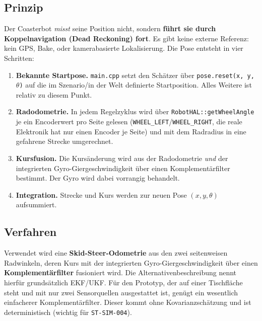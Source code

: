 \documentclass[
  a4paper,
  12pt,
  DIV=12,        %
  parskip=half,  %
  headings=small %
]{scrartcl}
\theoremstyle{definition}
\providecommand{\tightlist}{%
  \setlength{\itemsep}{0pt}\setlength{\parskip}{0pt}}
\theoremstyle{definition}
\begin{document}
\subsection{Prinzip}\label{lokalisierung-prinzip}

Der Coasterbot \emph{misst} seine Position nicht, sondern \textbf{führt
sie durch Koppelnavigation (Dead Reckoning) fort}. Es gibt keine externe
Referenz: kein GPS, Bake, oder kamerabasierte Lokalisierung.
Die Pose entsteht in vier Schritten:

\begin{enumerate}
\tightlist
\item
  \textbf{Bekannte Startpose.} \texttt{main.cpp} setzt den Schätzer über
  \texttt{pose.reset(x,\,y,\,\ensuremath{\theta})} auf die im
  Szenario/in der Welt definierte Startposition. Alles Weitere ist
  relativ zu diesem Punkt.
\item
  \textbf{Radodometrie.} In jedem Regelzyklus wird über
  \texttt{RobotHAL::getWheelAngle} je ein Encoderwert pro Seite gelesen
  (\texttt{WHEEL\_LEFT}/\texttt{WHEEL\_RIGHT}, die reale Elektronik hat
  nur einen Encoder je Seite) und mit dem Radradius in eine gefahrene
  Strecke umgerechnet.
\item
  \textbf{Kursfusion.} Die Kursänderung wird aus der Radodometrie
  \emph{und} der integrierten Gyro-Giergeschwindigkeit über einen
  Komplementärfilter bestimmt. Der Gyro wird dabei vorrangig behandelt.
\item
  \textbf{Integration.} Strecke und Kurs werden zur neuen Pose
  $(x, y, \theta)$ aufsummiert.
\end{enumerate}

\subsection{Verfahren}\label{lokalisierung-verfahren}

Verwendet wird eine \textbf{Skid-Steer-Odometrie} aus den zwei
seitenweisen Radwinkeln, deren Kurs mit der integrierten
Gyro-Giergeschwindigkeit über einen \textbf{Komplementärfilter}
fusioniert wird. Die
Alternativenbeschreibung nennt hierfür grundsätzlich EKF/UKF\@. Für den
Prototyp, der auf einer Tischfläche steht und mit nur zwei Sensorquellen ausgestattet
ist, genügt ein wesentlich einfacherer Komplementärfilter. Dieser kommt ohne
Kovarianzschätzung und ist deterministisch (wichtig für
\texttt{ST-SIM-004}).
\end{document}
